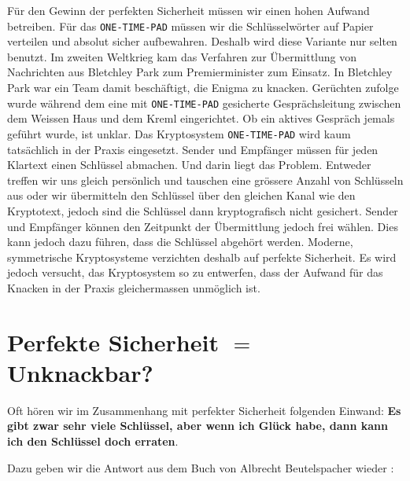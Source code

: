 Für den Gewinn der perfekten Sicherheit müssen wir einen hohen Aufwand betreiben. Für das  \texttt{ONE-TIME-PAD} müssen wir die Schlüsselwörter auf Papier verteilen und absolut sicher aufbewahren. Deshalb wird diese Variante nur selten benutzt. Im zweiten Weltkrieg kam das Verfahren zur Übermittlung von Nachrichten aus Bletchley Park zum Premierminister zum Einsatz. In Bletchley Park war ein Team damit beschäftigt, die Enigma zu knacken. Gerüchten zufolge wurde während dem  eine mit \texttt{ONE-TIME-PAD} gesicherte Gesprächsleitung zwischen dem Weissen Haus und dem Kreml eingerichtet. Ob ein aktives Gespräch jemals geführt wurde, ist unklar. Das Kryptosystem \texttt{ONE-TIME-PAD} wird kaum tatsächlich in der Praxis eingesetzt. Sender und Empfänger müssen für jeden Klartext einen Schlüssel abmachen. Und darin liegt das Problem. Entweder treffen wir uns gleich persönlich und tauschen eine grössere Anzahl von Schlüsseln aus oder wir übermitteln den Schlüssel über den gleichen Kanal wie den Kryptotext, jedoch sind die Schlüssel dann kryptografisch nicht gesichert. Sender und Empfänger können den Zeitpunkt der Übermittlung jedoch frei wählen. Dies kann jedoch dazu führen, dass die Schlüssel abgehört werden. Moderne, symmetrische Kryptosysteme verzichten deshalb auf perfekte Sicherheit. Es wird jedoch versucht, das Kryptosystem so zu entwerfen, dass der Aufwand für das Knacken in der Praxis gleichermassen unmöglich ist.

\newpage

\section{Perfekte Sicherheit $=$ Unknackbar?}

Oft hören wir im Zusammenhang mit perfekter Sicherheit folgenden Einwand: \textbf{Es gibt zwar sehr viele Schlüssel, aber wenn ich Glück habe, dann kann ich den Schlüssel doch erraten}.

Dazu geben wir die Antwort aus dem Buch  von Albrecht Beutelspacher wieder \cite{beutelspacher2015kryptologie}:

